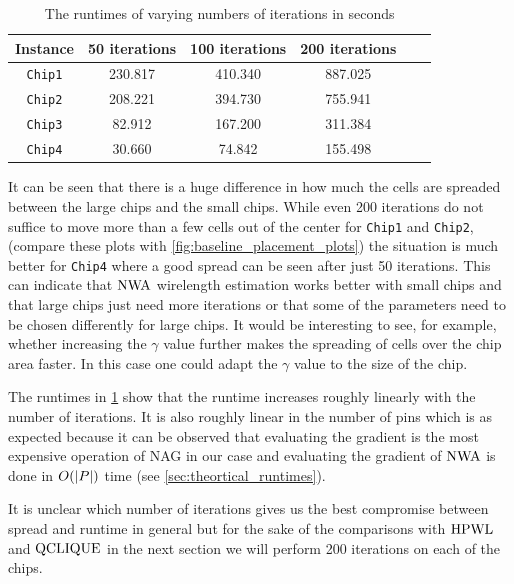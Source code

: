 \begin{table}[ht] 
 \centering
 \begin{tabular}{c c c c c c}
  Instance       & 50 iterations & 100 iterations   & 200 iterations \\
  \hline
  \texttt{Chip1} & 230.817       & 410.340          & 887.025 \\
  \texttt{Chip2} & 208.221       & 394.730          & 755.941 \\
  \texttt{Chip3} & 82.912        & 167.200          & 311.384 \\
  \texttt{Chip4} & 30.660        & 74.842           & 155.498 \\
 \end{tabular}
 \caption{The runtimes of varying numbers of iterations in seconds}
 \label{table:runtime_depending_on_max_iterations}
\end{table}

It can be seen that there is a huge difference in how much the cells are spreaded
between the large chips and the small chips.
While even 200 iterations do not suffice to move more than a few cells out of the center for \texttt{Chip1} and \texttt{Chip2},
(compare these plots with \cref{fig:baseline_placement_plots})
the situation is much better for \texttt{Chip4} where a good spread can be seen after just 50 iterations.
This can indicate that \(\operatorname{NWA}\) wirelength estimation works better with small chips
and that large chips just need more iterations or that some of the parameters need to be chosen differently for large chips.
It would be interesting to see, for example, whether increasing the \(\gamma\) value further
makes the spreading of cells over the chip area faster.
In this case one could adapt the \(\gamma\) value to the size of the chip.

The runtimes in \cref{table:runtime_depending_on_max_iterations} show that
the runtime increases roughly linearly with the number of iterations.
It is also roughly linear in the number of pins which is as expected because it can be observed
that evaluating the gradient is the most expensive operation of NAG in our case
and evaluating the gradient of \(\operatorname{NWA}\) is done in \(O(\lvert P\rvert)\) time (see \cref{sec:theortical_runtimes}).

It is unclear which number of iterations gives us the best compromise between spread and runtime in general
but for the sake of the comparisons with \(\operatorname{HPWL}\) and \(\operatorname{QCLIQUE}\) in the next section
we will perform 200 iterations on each of the chips.

